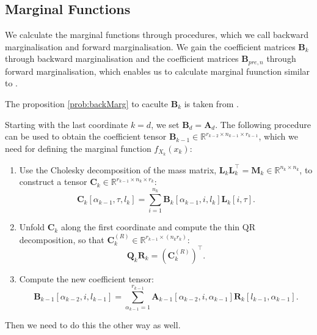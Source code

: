 \subsection{Marginal Functions}

We calculate the marginal functions through procedures, which we call backward marginalisation \cite{} and forward marginalisation.
We gain the coefficient matrices $\bm{B}_k$ through backward marginalisation and the coefficient matrices $\bm{B}_{pre,n}$ through forward marginalisation, which enables us to calculate marginal fuunction similar to \cite{}.




The proposition \ref{prob:backMarg} to caculte $\bm{B}_k$  is taken from \cite{}.

\begin{prop}
	Starting with the last coordinate $k = d$, we set $\bm{B}_d = \bm{A}_d$. The following procedure can be used to obtain the coefficient tensor $\bm{B}_{k-1} \in \mathbb{R}^{r_{k-2} \times n_{k-1} \times r_{k-1}}$, which we need for defining the marginal function $f_{X_k}(x_k)$:
	\begin{enumerate}
		\item Use the Cholesky decomposition of the mass matrix, $\bm{L}_k \bm{L}_k^\top = \bm{M}_k \in \mathbb{R}^{n_k \times n_k}$, to construct a tensor $\bm{C}_k \in \mathbb{R}^{r_{k-1} \times n_k \times r_k}$:
		\begin{equation}
			\bm{C}_k[\alpha_{k-1}, \tau, l_k] = \sum_{i=1}^{n_k} \bm{B}_k[\alpha_{k-1}, i, l_k] \bm{L}_k[i, \tau].
		\end{equation}
		\item Unfold $\bm{C}_k$ along the first coordinate and compute the thin QR decomposition, so that $\bm{C}_k^{(R)} \in \mathbb{R}^{r_{k-1} \times (n_k r_k)}$:
		\begin{equation}
			\bm{Q}_k \bm{R}_k = {(\bm{C}_k^{(R)})}^{\top}.
		\end{equation}
		\item Compute the new coefficient tensor:
		\begin{equation}
			\bm{B}_{k-1}[\alpha_{k-2}, i, l_{k-1}] = \sum_{\alpha_{k-1}=1}^{r_{k-1}} \bm{A}_{k-1}[\alpha_{k-2}, i, \alpha_{k-1}] \bm{R}_k[l_{k-1}, \alpha_{k-1}].
		\end{equation}
	\end{enumerate}
\label{prob:backMarg}
\end{prop}

Then we need to do this the other way as well.


